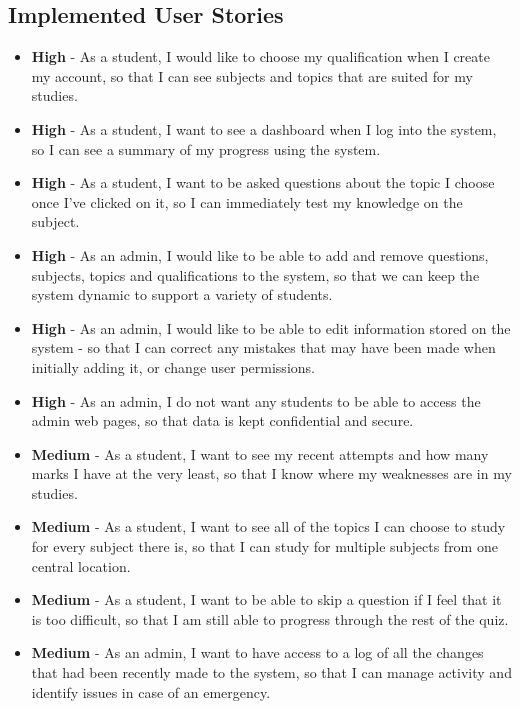 \documentclass[]{final_report}
\begin{document}
\subsection{Implemented User Stories}
\begin{itemize}
	\item \textbf{High} - As a student, I would like to choose my qualification when I create my account, so that I can see subjects and topics that are suited for my studies.
	
	\item \textbf{High} -  As a student, I want to see a dashboard when I log into the system, so I can see a summary of my progress using the system.

	\item \textbf{High} - As a student, I want to be asked questions about the topic I choose once I've clicked on it, so I can immediately test my knowledge on the subject.

	\item \textbf{High} - As an admin, I would like to be able to add and remove questions, subjects, topics and qualifications to the system, so that we can keep the system dynamic to support a variety of students.
	
	\item \textbf{High} - As an admin, I would like to be able to edit information stored on the system - so that I can correct any mistakes that may have been made when initially adding it, or change user permissions.
	
	\item \textbf{High} - As an admin, I do not want any students to be able to access the admin web pages, so that data is kept confidential and secure.

	\item \textbf{Medium} - As a student, I want to see my recent attempts and how many marks I have at the very least, so that I know where my weaknesses are in my studies.
	
	\item \textbf{Medium} - As a student, I want to see all of the topics I can choose to study for every subject there is, so that I can study for multiple subjects from one central location.
	
	\item \textbf{Medium} - As a student, I want to be able to skip a question if I feel that it is too difficult, so that I am still able to progress through the rest of the quiz.

	\item \textbf{Medium} - As an admin, I want to have access to a log of all the changes that had been recently made to the system, so that I can manage activity and identify issues in case of an emergency.


\end{itemize}
\end{document}
